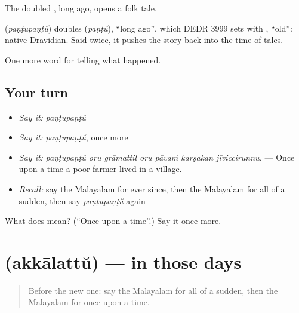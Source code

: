 The doubled , long ago, opens a folk tale.

\begin{cousinweb}
\textbf{} (\emph{paṇṭupaṇṭŭ}) doubles  (\emph{paṇṭŭ}), \textquotedblleft{}long ago\textquotedblright{}, which DEDR 3999 sets with , \textquotedblleft{}old\textquotedblright{}: native Dravidian. Said twice, it pushes the story back into the time of tales.
\end{cousinweb}

\begin{grammarlens}[title={What you've built}]
One more word for telling what happened.
\end{grammarlens}

\subsection*{Your turn}
\begin{itemize}
\raggedright
  \item \emph{Say it:} \emph{paṇṭupaṇṭŭ}
  \item \emph{Say it:} \emph{paṇṭupaṇṭŭ}, once more
  \item \emph{Say it:} \emph{paṇṭupaṇṭŭ oru grāmattil oru pāvaṁ karṣakan jīviccirunnu.} — Once upon a time a poor farmer lived in a village.
  \item \emph{Recall:} say the Malayalam for ever since, then the Malayalam for all of a sudden, then say \emph{paṇṭupaṇṭŭ} again
\end{itemize}

\begin{tcolorbox}[breakable,colback=teal!4,colframe=teal!35!black,title={Before you move on}]
What does  mean? (\textquotedblleft{}Once upon a time\textquotedblright{}.) Say it once more.
\end{tcolorbox}
\section[\texorpdfstring{\ml{അക്കാലത്ത്} (akkālattŭ)}{അക്കാലത്ത് (akkālattŭ)}]{ (akkālattŭ) — in those days}

\label{lesson:ML-C358-akkalattu}



\begin{quote}
Before the new one: say the Malayalam for all of a sudden, then the Malayalam for once upon a time.
\end{quote}

